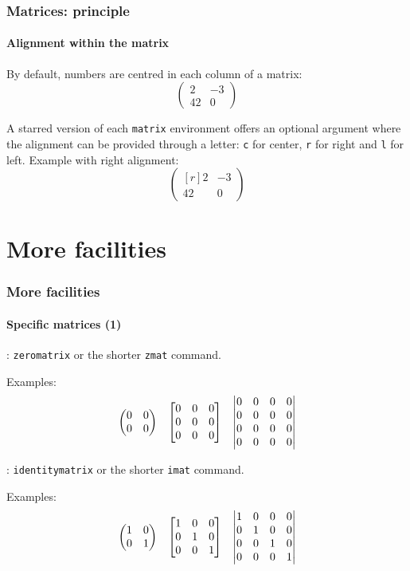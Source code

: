 \documentclass[11pt]{beamer}
\begin{document}
\begin{frame}
	\frametitle{Matrices: principle}
	\framesubtitle{Alignment within the matrix}
	
	By default, numbers are centred in each column of a matrix:
	\begin{equation*}
		\begin{pmatrix}
			2  & -3 \\
			42 & 0
		\end{pmatrix}
	\end{equation*}
	
	A starred version of each \texttt{matrix} environment offers an optional argument where the alignment can be provided through a letter: \texttt{c} for center, \texttt{r} for right and \texttt{l} for left.
	Example with right alignment:
	\begin{equation*}
		\begin{pmatrix*}[r]
			2  & -3 \\
			42 & 0
		\end{pmatrix*}
	\end{equation*}
\end{frame}


\section{More facilities}

\begin{frame}
	\frametitle{More facilities}
	\framesubtitle{Specific matrices (1)}
	
	: \texttt{zeromatrix} or the shorter \texttt{zmat} command.
	
	Examples:
	\begin{align*}
		\begin{pmatrix}
			\zmat{2}
		\end{pmatrix}
		&&
		\begin{bmatrix}
			\zmat{3}
		\end{bmatrix}
		&&
		\begin{vmatrix}
			\zmat{4}
		\end{vmatrix}
	\end{align*}
	

	: \texttt{identitymatrix} or the shorter \texttt{imat} command.
	
	Examples:
	\begin{align*}
		\begin{pmatrix}
			\imat{2}
		\end{pmatrix}
		&&
		\begin{bmatrix}
			\imat{3}
		\end{bmatrix}
		&&
		\begin{vmatrix}
			\imat{4}
		\end{vmatrix}
	\end{align*}
\end{frame}
\end{document}
